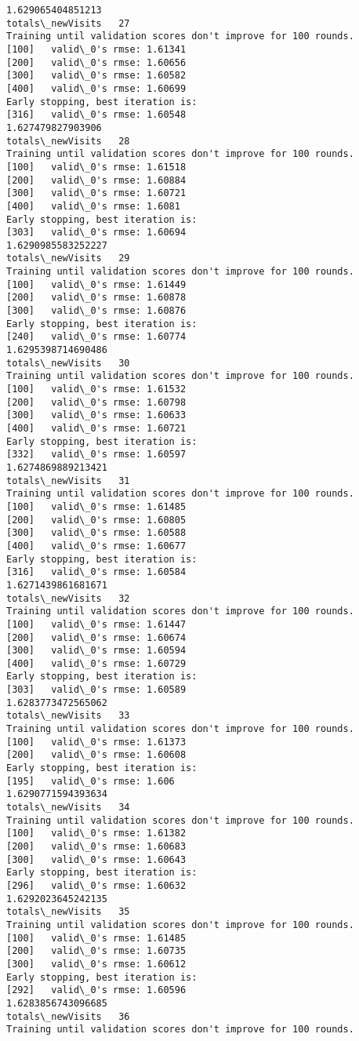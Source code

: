 \documentclass[11pt]{article}
\begin{document}
\begin{Verbatim}[commandchars=\\\{\}]
1.629065404851213
totals\_newVisits   27
Training until validation scores don't improve for 100 rounds.
[100]	valid\_0's rmse: 1.61341
[200]	valid\_0's rmse: 1.60656
[300]	valid\_0's rmse: 1.60582
[400]	valid\_0's rmse: 1.60699
Early stopping, best iteration is:
[316]	valid\_0's rmse: 1.60548
1.627479827903906
totals\_newVisits   28
Training until validation scores don't improve for 100 rounds.
[100]	valid\_0's rmse: 1.61518
[200]	valid\_0's rmse: 1.60884
[300]	valid\_0's rmse: 1.60721
[400]	valid\_0's rmse: 1.6081
Early stopping, best iteration is:
[303]	valid\_0's rmse: 1.60694
1.6290985583252227
totals\_newVisits   29
Training until validation scores don't improve for 100 rounds.
[100]	valid\_0's rmse: 1.61449
[200]	valid\_0's rmse: 1.60878
[300]	valid\_0's rmse: 1.60876
Early stopping, best iteration is:
[240]	valid\_0's rmse: 1.60774
1.6295398714690486
totals\_newVisits   30
Training until validation scores don't improve for 100 rounds.
[100]	valid\_0's rmse: 1.61532
[200]	valid\_0's rmse: 1.60798
[300]	valid\_0's rmse: 1.60633
[400]	valid\_0's rmse: 1.60721
Early stopping, best iteration is:
[332]	valid\_0's rmse: 1.60597
1.6274869889213421
totals\_newVisits   31
Training until validation scores don't improve for 100 rounds.
[100]	valid\_0's rmse: 1.61485
[200]	valid\_0's rmse: 1.60805
[300]	valid\_0's rmse: 1.60588
[400]	valid\_0's rmse: 1.60677
Early stopping, best iteration is:
[316]	valid\_0's rmse: 1.60584
1.6271439861681671
totals\_newVisits   32
Training until validation scores don't improve for 100 rounds.
[100]	valid\_0's rmse: 1.61447
[200]	valid\_0's rmse: 1.60674
[300]	valid\_0's rmse: 1.60594
[400]	valid\_0's rmse: 1.60729
Early stopping, best iteration is:
[303]	valid\_0's rmse: 1.60589
1.6283773472565062
totals\_newVisits   33
Training until validation scores don't improve for 100 rounds.
[100]	valid\_0's rmse: 1.61373
[200]	valid\_0's rmse: 1.60608
Early stopping, best iteration is:
[195]	valid\_0's rmse: 1.606
1.6290771594393634
totals\_newVisits   34
Training until validation scores don't improve for 100 rounds.
[100]	valid\_0's rmse: 1.61382
[200]	valid\_0's rmse: 1.60683
[300]	valid\_0's rmse: 1.60643
Early stopping, best iteration is:
[296]	valid\_0's rmse: 1.60632
1.6292023645242135
totals\_newVisits   35
Training until validation scores don't improve for 100 rounds.
[100]	valid\_0's rmse: 1.61485
[200]	valid\_0's rmse: 1.60735
[300]	valid\_0's rmse: 1.60612
Early stopping, best iteration is:
[292]	valid\_0's rmse: 1.60596
1.6283856743096685
totals\_newVisits   36
Training until validation scores don't improve for 100 rounds.

\end{Verbatim}
\end{document}
